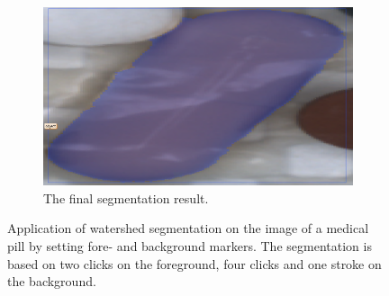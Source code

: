\begin{figure}
	\hfill
	\begin{subfigure}[t]{0.45\textwidth}
		\centering
		\includegraphics[width=\textwidth]{figures/chap32_watershed_application6.png}
		\caption{
			The final segmentation result.\newline	
		} \label{fig:ch3:sec3:application6}
	\end{subfigure}
	\caption [Watershed User Interaction]{
		Application of watershed segmentation on the image of a medical pill by setting fore- and background markers.
		The segmentation is based on two clicks on the foreground, four clicks and one stroke on the background.
	} \label{fig:ch3:sec2:application}
\end{figure}



